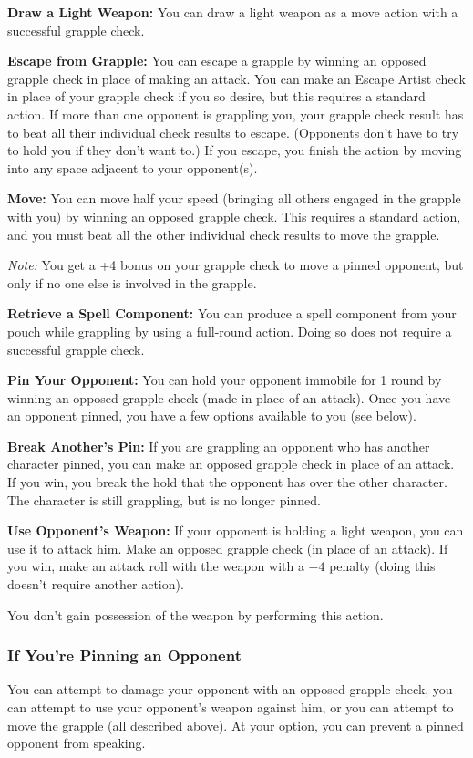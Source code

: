 \textbf{Draw a Light Weapon:} You can draw a light weapon as a move action with a successful grapple check.

\textbf{Escape from Grapple:} You can escape a grapple by winning an opposed grapple check in place of making an attack. You can make an Escape Artist check in place of your grapple check if you so desire, but this requires a standard action. If more than one opponent is grappling you, your grapple check result has to beat all their individual check results to escape. (Opponents don't have to try to hold you if they don't want to.) If you escape, you finish the action by moving into any space adjacent to your opponent(s).

\textbf{Move:} You can move half your speed (bringing all others engaged in the grapple with you) by winning an opposed grapple check. This requires a standard action, and you must beat all the other individual check results to move the grapple.

\textit{Note:} You get a +4 bonus on your grapple check to move a pinned opponent, but only if no one else is involved in the grapple.

\textbf{Retrieve a Spell Component:} You can produce a spell component from your pouch while grappling by using a full-round action. Doing so does not require a successful grapple check.

\textbf{Pin Your Opponent:} You can hold your opponent immobile for 1 round by winning an opposed grapple check (made in place of an attack). Once you have an opponent pinned, you have a few options available to you (see below).

\textbf{Break Another's Pin:} If you are grappling an opponent who has another character pinned, you can make an opposed grapple check in place of an attack. If you win, you break the hold that the opponent has over the other character. The character is still grappling, but is no longer pinned.

\textbf{Use Opponent's Weapon:} If your opponent is holding a light weapon, you can use it to attack him. Make an opposed grapple check (in place of an attack). If you win, make an attack roll with the weapon with a $-4$ penalty (doing this doesn't require another action).

You don't gain possession of the weapon by performing this action.

\subsubsection{If You're Pinning an Opponent}
You can attempt to damage your opponent with an opposed grapple check, you can attempt to use your opponent's weapon against him, or you can attempt to move the grapple (all described above). At your option, you can prevent a pinned opponent from speaking.


